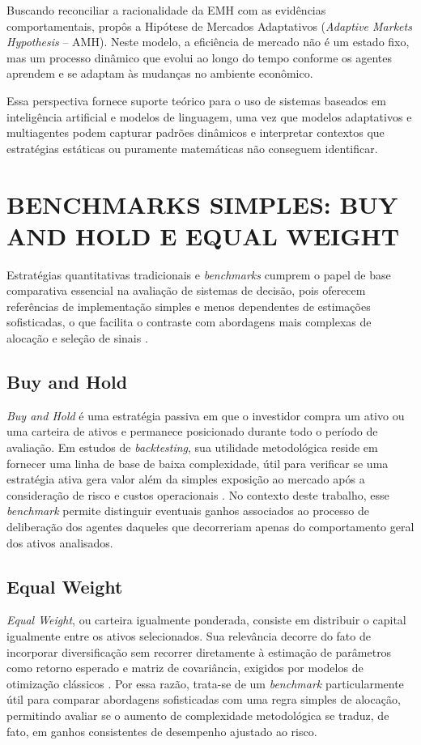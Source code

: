 \documentclass{eic-bcc-tcc}
\begin{document}
Buscando reconciliar a racionalidade da EMH com as evidências comportamentais, \citet{Lo2004} propôs a Hipótese de Mercados Adaptativos (\textit{Adaptive Markets Hypothesis} -- AMH). Neste modelo, a eficiência de mercado não é um estado fixo, mas um processo dinâmico que evolui ao longo do tempo conforme os agentes aprendem e se adaptam às mudanças no ambiente econômico.

Essa perspectiva fornece suporte teórico para o uso de sistemas baseados em inteligência artificial e modelos de linguagem, uma vez que modelos adaptativos e multiagentes podem capturar padrões dinâmicos e interpretar contextos que estratégias estáticas ou puramente matemáticas não conseguem identificar.

\section{BENCHMARKS SIMPLES: BUY AND HOLD E EQUAL WEIGHT}

Estratégias quantitativas tradicionais e \textit{benchmarks} cumprem o papel de base comparativa essencial na avaliação de sistemas de decisão, pois oferecem referências de implementação simples e menos dependentes de estimações sofisticadas, o que facilita o contraste com abordagens mais complexas de alocação e seleção de sinais \citep{Markowitz1952, Clarke2006, LopezDePrado2018}.

\subsection{Buy and Hold}
\textit{Buy and Hold} é uma estratégia passiva em que o investidor compra um ativo ou uma carteira de ativos e permanece posicionado durante todo o período de avaliação. Em estudos de \textit{backtesting}, sua utilidade metodológica reside em fornecer uma linha de base de baixa complexidade, útil para verificar se uma estratégia ativa gera valor além da simples exposição ao mercado após a consideração de risco e custos operacionais \citep{LopezDePrado2018, Bailey2017}. No contexto deste trabalho, esse \textit{benchmark} permite distinguir eventuais ganhos associados ao processo de deliberação dos agentes daqueles que decorreriam apenas do comportamento geral dos ativos analisados.

\subsection{Equal Weight}
\textit{Equal Weight}, ou carteira igualmente ponderada, consiste em distribuir o capital igualmente entre os ativos selecionados. Sua relevância decorre do fato de incorporar diversificação sem recorrer diretamente à estimação de parâmetros como retorno esperado e matriz de covariância, exigidos por modelos de otimização clássicos \citep{Markowitz1952, Clarke2006, DeMiguel2009}. Por essa razão, trata-se de um \textit{benchmark} particularmente útil para comparar abordagens sofisticadas com uma regra simples de alocação, permitindo avaliar se o aumento de complexidade metodológica se traduz, de fato, em ganhos consistentes de desempenho ajustado ao risco.
\end{document}
